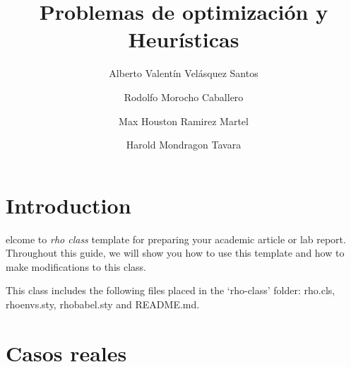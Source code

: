 \documentclass[9pt,a4paper,twoside]{rho-class/rho}
\title{ Problemas de optimización y Heurísticas}
\author[1]{Alberto Valentín Velásquez Santos}
\author[2]{Rodolfo Morocho Caballero}
\author[3]{Max Houston Ramirez Martel}
\author[4]{Harold Mondragon Tavara}
\affil[1]{Alberto Valentín Velásquez Santos}
\affil[2]{Rodolfo Morocho Caballero}
\affil[3]{Max Houston Ramirez Martel}
\affil[4]{Harold Mondragon Tavara}
\begin{document}
	
    \maketitle
    \thispagestyle{firststyle}
    \linenumbers


\section{Introduction}

    elcome to \textit{rho class} template for preparing your academic article or lab report. Throughout this guide, we will show you how to use this template and how to make modifications to this class. 
    
    This class includes the following files placed in the ‘rho-class’ folder: rho.cls, rhoenvs.sty, rhobabel.sty and README.md.

\section{Casos reales}
\end{document}
